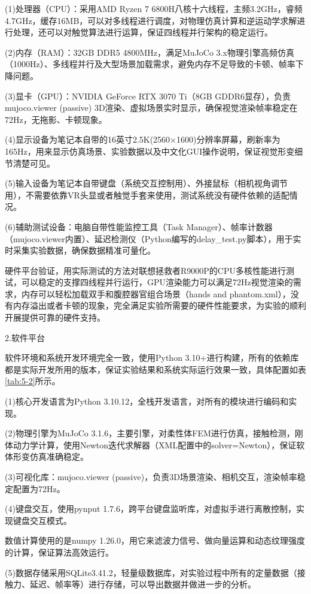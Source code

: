 (1)处理器（CPU）：采用AMD Ryzen 7
6800H八核十六线程，主频3.2GHz，睿频4.7GHz，缓存16MB，可以对多线程进行调度，对物理仿真计算和逆运动学求解进行处理，还可以对触觉算法进行运算，保证四线程并行架构的稳定运行。

(2)内存（RAM）：32GB DDR5 4800MHz，满足MuJoCo
3.x物理引擎高频仿真（1000Hz）、多线程并行及大型场景加载需求，避免内存不足导致的卡顿、帧率下降问题。

(3)显卡（GPU）：NVIDIA GeForce RTX 3070 Ti（8GB
GDDR6显存），负责mujoco.viewer (passive)
3D渲染、虚拟场景实时显示，确保视觉渲染帧率稳定在72Hz，无拖影、卡顿现象。

(4)显示设备为笔记本自带的16英寸2.5K(2560×1600)分辨率屏幕，刷新率为165Hz，用来显示仿真场景、实验数据以及中文化GUI操作说明，保证视觉形变细节清楚可见。

(5)输入设备为笔记本自带键盘（系统交互控制用）、外接鼠标（相机视角调节用），不需要依靠VR头显或者触觉手套来使用，测试系统没有硬件依赖的适配情况。

(6)辅助测试设备：电脑自带性能监控工具（Task
Manager）、帧率计数器（mujoco.viewer内置）、延迟检测仪（Python编写的delay\_test.py脚本），用于实时采集实验数据，确保数据精准可量化。

硬件平台验证，用实际测试的方法对联想拯救者R9000P的CPU多核性能进行测试，可以稳定的支撑四线程并行运行，GPU渲染能力可以满足72Hz视觉渲染的需求，内存可以轻松加载双手和腹腔器官组合场景（hands
and
phantom.xml），没有内存溢出或者卡顿的现象，完全满足实验所需要的硬件性能要求，为实验的顺利开展提供可靠的硬件支持。

2.软件平台

软件环境和系统开发环境完全一致，使用Python
3.10+进行构建，所有的依赖库都是实际开发所用的版本，保证实验结果和系统实际运行效果一致，具体配置如表\ref{tab:5-2}所示。

(1)核心开发语言为Python
3.10.12，全栈开发语言，对所有的模块进行编码和实现。

(2)物理引擎为MuJoCo
3.1.6，主要引擎，对柔性体FEM进行仿真，接触检测，刚体动力学计算，使用Newton迭代求解器（XML配置中的solver=Newton），保证软体形变仿真准确稳定。

(3)可视化库：mujoco.viewer
(passive)，负责3D场景渲染、相机交互，渲染帧率稳定配置为72Hz。

(4)键盘交互，使用pynput
1.7.6，跨平台键盘监听库，对虚拟手进行离散控制，实现键盘交互模式。

数值计算使用的是numpy
1.26.0，用它来滤波力信号、做向量运算和动态纹理强度的计算，保证算法高效运行。

(5)数据存储采用SQLite3.41.2，轻量级数据库，对实验过程中所有的定量数据（接触力、延迟、帧率等）进行存储，可以导出数据并做进一步的分析。

